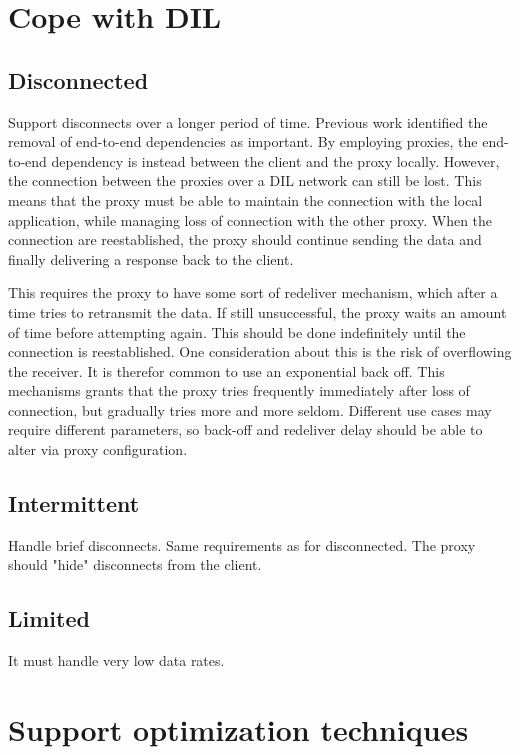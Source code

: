 \section{Cope with DIL}

\subsection{Disconnected}

Support disconnects over a longer period of time. Previous work identified the
removal of end-to-end dependencies as important. By employing proxies, the
end-to-end dependency is instead between the client and the proxy locally.
However, the connection between the proxies over a DIL network can still be
lost. This means that the proxy must be able to maintain the connection with the
local application, while managing loss of connection with the other proxy. When
the connection are reestablished, the proxy should continue sending the data and
finally delivering a response back to the client.

This requires the proxy to have some sort of redeliver mechanism, which after a
time tries to retransmit the data. If still unsuccessful, the proxy waits an
amount of time before attempting again. This should be done indefinitely until
the connection is reestablished. One consideration about this is the risk of
overflowing the receiver. It is therefor common to use an exponential back off.
This mechanisms grants that the proxy tries frequently immediately after loss of
connection, but gradually tries more and more seldom. Different use cases may
require different parameters, so back-off and redeliver delay should be able to
alter via proxy configuration.

\subsection{Intermittent}

Handle brief disconnects. Same requirements as for disconnected. The proxy
should "hide" disconnects from the client.

\subsection{Limited}

It must handle very low data rates.

\section{Support optimization techniques}


